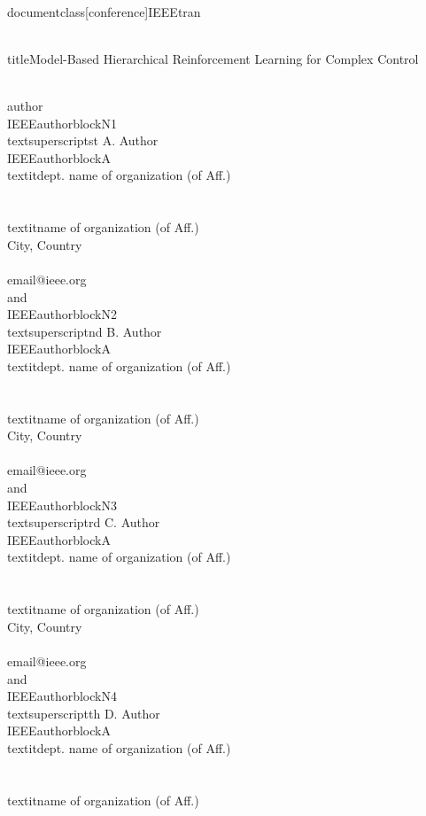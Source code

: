 \\documentclass[conference]{IEEEtran}
\begin{document}
\\title{Model-Based Hierarchical Reinforcement Learning for Complex Control}

\\author{\\IEEEauthorblockN{1\\textsuperscript{st} A. Author}
\\IEEEauthorblockA{\\textit{dept. name of organization (of Aff.)} \\\\
\\textit{name of organization (of Aff.)}\\
City, Country \\\\
email@ieee.org}
\\and
\\IEEEauthorblockN{2\\textsuperscript{nd} B. Author}
\\IEEEauthorblockA{\\textit{dept. name of organization (of Aff.)} \\\\
\\textit{name of organization (of Aff.)}\\
City, Country \\\\
email@ieee.org}
\\and
\\IEEEauthorblockN{3\\textsuperscript{rd} C. Author}
\\IEEEauthorblockA{\\textit{dept. name of organization (of Aff.)} \\\\
\\textit{name of organization (of Aff.)}\\
City, Country \\\\
email@ieee.org}
\\and
\\IEEEauthorblockN{4\\textsuperscript{th} D. Author}
\\IEEEauthorblockA{\\textit{dept. name of organization (of Aff.)} \\\\
\\textit{name of organization (of Aff.)}\\
}}
\end{document}
